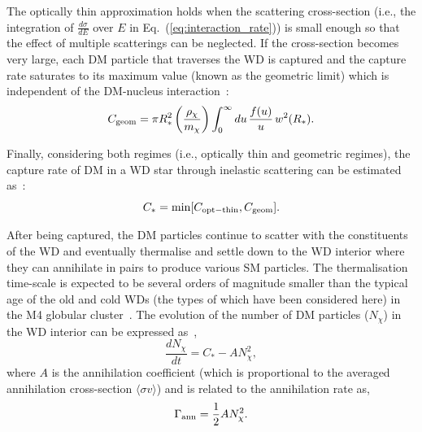 \documentclass[11pt]{article}
\begin{document}
The optically thin approximation holds when the 
scattering cross-section (i.e., the integration of $\frac{d\sigma}{dE}$ over $E$ in Eq.~(\ref{eq:interaction_rate})) is small enough so that the effect of multiple scatterings can be neglected. If the cross-section becomes very large, each DM particle that traverses the WD
is captured and the capture rate saturates to its maximum value (known as the geometric limit) 
which is independent of the DM-nucleus interaction~\cite{improved_WD_2021, dm_cap_sun_Garani2017, idm_wd_2010_Hooper, dm_stars_Bertone2007, dm_cap_sun_Bottino2002}:
\begin{equation}
C_{\rm geom} = \pi R^2_* \left( \frac{\rho_{\chi}}{m_{\chi}} \right) \int_0^{\infty} 
du \hspace{0.5mm} \frac{f(u)}{u} \hspace{0.5mm} w^2(R_*).
\label{eq:C_geom}
\end{equation}

Finally, considering both regimes (i.e., optically thin and geometric regimes), 
the capture rate of DM in a WD star through inelastic scattering 
can be estimated as~\cite{higgino_wd_2019, dm_cap_sun_Garani2017, dm_cap_sun_Bernal2012, dm_stars_Bertone2007}: 
\begin{equation}
C_{*} = {\rm min} [C_{\rm opt-thin}, C_{\rm geom}] .
\label{eq:C_approx}
\end{equation}


After being captured, the DM particles continue to scatter with the constituents of the WD and eventually thermalise and settle down to the WD interior where they can annihilate in pairs 
to produce various SM particles. The thermalisation time-scale is expected to be several orders of magnitude smaller than the 
typical age of the old and cold WDs (the types of which have been considered here) in the M4 globular cluster~\cite{improved_WD_2021}. 
The evolution of the number of DM particles ($N_{\chi}$) in the WD interior can be 
expressed as~\cite{improved_WD_2021}, 
\begin{equation}
\frac{dN_{\chi}}{dt} = C_* - A N^2_{\chi} ,
\label{eq:dNchi_dt}
\end{equation}
where $A$ is the annihilation coefficient (which is proportional to 
the averaged annihilation cross-section $\langle \sigma v \rangle$) and is related to the annihilation rate as, 
\begin{equation}
\Gamma_{\rm ann} = \frac{1}{2} A N^2_{\chi} .
\label{eq:ann_rate}
\end{equation}
\end{document}
